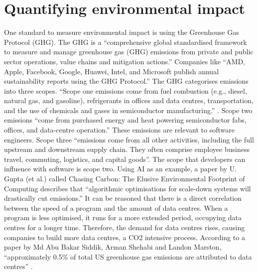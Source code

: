 \section{Quantifying environmental impact}
One standard to measure environmental impact is using the Greenhouse Gas Protocol (GHG). The GHG is a “comprehensive global standardised framework to measure and manage greenhouse gas (GHG) emissions from private and public sector operations, value chains and mitigation actions.” \cite{GHGProtocol} Companies like “AMD, Apple, Facebook, Google, Huawei, Intel, and Microsoft publish annual sustainability reports using the GHG Protocol.”\cite[p.855]{9407142}  The GHG categorises emissions into three scopes. “Scope one emissions come from fuel combustion (e.g., diesel, natural gas, and gasoline), refrigerants in offices and data centres, transportation, and the use of chemicals and gases in semiconductor manufacturing.” \cite[p.856]{9407142}. Scope two emissions “come from purchased energy and heat powering semiconductor fabs, offices, and data-centre operation.” \cite[p.856]{9407142} These emissions are relevant to software engineers. Scope three “emissions come from all other activities, including the full upstream and downstream supply chain. They often comprise employee business travel, commuting, logistics, and capital goods”. \cite[p.856]{9407142}
The scope that developers can influence with software is scope two. Using AI as an example, a paper by U. Gupta (et al.) called Chasing Carbon: The Elusive Environmental Footprint of Computing describes that “algorithmic optimisations for scale-down systems will drastically cut emissions.” \cite[p.863]{9407142}
It can be reasoned that there is a direct correlation between the speed of a program and the amount of data centres. When a program is less optimised, it runs for a more extended period, occupying data centres for a longer time. Therefore, the demand for data centres rises, causing companies to build more data centres, a CO2 intensive process. According to a paper by Md Abu Bakar Siddik, Arman Shehabi and Landon Marston, “approximately 0.5\% of total US greenhouse gas emissions are attributed to data centres” \cite{Siddik_2021}.
